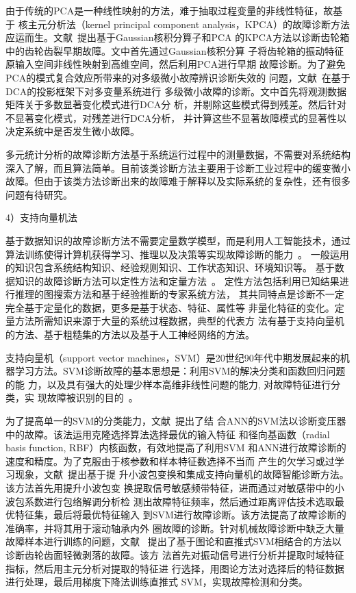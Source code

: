 由于传统的PCA是一种线性映射的方法，难于抽取过程变量的非线性特征，故基于
核主元分析法（kernel principal component analysis，KPCA）的故障诊断方法
应运而生。文献~提出基于Gaussian核积分算子和PCA
的KPCA方法以诊断齿轮箱中的齿轮齿裂早期故障。文中首先通过Gaussian核积分算
子将齿轮箱的振动特征原输入空间非线性映射到高维空间，然后利用PCA进行早期
故障诊断。为了避免PCA的模式复合效应所带来的对多级微小故障辨识诊断失效的
问题，文献~在基于DCA的投影框架下对多变量系统进行
多级微小故障的诊断。文中首先将观测数据矩阵关于多数显著变化模式进行DCA分
析，并剔除这些模式得到残差。然后针对不显著变化模式，对残差进行DCA分析，
并计算这些不显著故障模式的显著性以决定系统中是否发生微小故障。

多元统计分析的故障诊断方法基于系统运行过程中的测量数据，不需要对系统结构
深入了解，而且算法简单。目前该类诊断方法主要用于诊断工业过程中的缓变微小
故障。但由于该类方法诊断出来的故障难于解释以及实际系统的复杂性，还有很多
问题有待研究。

4）支持向量机法

基于数据知识的故障诊断方法不需要定量数学模型，而是利用人工智能技术，通过
算法训练使得计算机获得学习、推理以及决策等实现故障诊断的能力~\cite{venkatasubramanian2003reviewpart3}。
一般运用的知识包含系统结构知识、经验规则知识、工作状态知识、环境知识等。
基于数据知识的故障诊断方法可以定性方法和定量方法~\cite{venkatasubramanian2003reviewpart3, venkatasubramanian2003reviewpart1, venkatasubramanian2003reviewpart2}。
定性方法包括利用已知结果进行推理的图搜索方法和基于经验推断的专家系统方法，
其共同特点是诊断不一定完全基于定量化的数据，更多是基于状态、特征、属性等
非量化特征的变化。定量方法所需知识来源于大量的系统过程数据，典型的代表方
法有基于支持向量机的方法、基于粗糙集的方法以及基于人工神经网络的方法。

支持向量机（support vector machines，SVM）是20世纪90年代中期发展起来的机
器学习方法。SVM诊断故障的基本思想是：利用SVM的解决分类和函数回归问题的能
力，以及具有强大的处理少样本高维非线性问题的能力, 对故障特征进行分类，实
现故障被识别的目的~\cite{huqiao2006improved}。

为了提高单一的SVM的分类能力，文献~提出了结
合ANN的SVM法以诊断变压器中的故障。该法运用克隆选择算法选择最优的输入特征
和径向基函数（radial basis function, RBF）内核函数，有效地提高了利用SVM
和ANN进行故障诊断的速度和精度。为了克服由于核参数和样本特征数选择不当而
产生的欠学习或过学习现象，文献~提出基于提
升小波包变换和集成支持向量机的故障智能诊断方法。该方法首先用提升小波包变
换提取信号敏感频带特征，进而通过对敏感带中的小波包系数进行包络解调分析检
测出故障特征频率，然后通过距离评估技术选取最优特征集，最后将最优特征输入
到SVM进行故障诊断。该方法提高了故障诊断的准确率，并将其用于滚动轴承内外
圈故障的诊断。针对机械故障诊断中缺乏大量故障样本进行训练的问题，文献~
提出了基于图论和直推式SVM相结合的方法以诊断齿轮齿面轻微剥落的故障。该方
法首先对振动信号进行分析并提取时域特征指标，然后用主元分析对提取的特征进
行选择，用图论方法对选择后的特征数据进行处理，最后用梯度下降法训练直推式
SVM，实现故障检测和分类。

